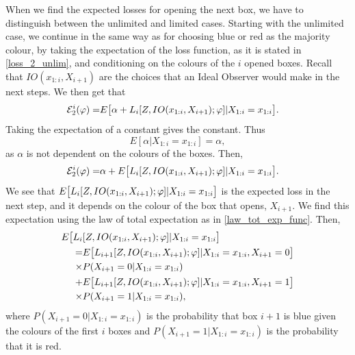 When we find the expected losses for opening the next box, we have to distinguish between the unlimited and limited cases. Starting with the unlimited case, we continue in the same way as for choosing blue or red as the majority colour, by taking the expectation of the loss function, as it is stated in \eqref{loss_2_unlim}, and conditioning on the colours of the $i$ opened boxes. Recall that $IO(x_{1:i},X_{i+1})$ are the choices that an Ideal Observer would make in the next steps. We then get that
\begin{equation*}
    \begin{aligned}
        \mathcal{E}^i_{2}(\varphi) 
        =& E \big[ \alpha + L_i[Z,IO(x_{1:i},X_{i+1});\varphi] |X_{1:i}=x_{1:i}\big].
    \end{aligned}
\end{equation*}
Taking the expectation of a constant gives the constant. Thus
\begin{equation*}
    E[\alpha|X_{1:i}=x_{1:i}]=\alpha,
\end{equation*}
as $\alpha$ is not dependent on the colours of the boxes. Then,
\begin{equation}
\label{exp_loss_unlim_2_unfinished}
    \begin{aligned}
        \mathcal{E}^i_{2}(\varphi) 
        =& \alpha + E \big[L_i[Z,IO(x_{1:i},X_{i+1});\varphi] |X_{1:i}=x_{1:i}\big].
    \end{aligned}
\end{equation}
We see that $E \big[L_i[Z,IO(x_{1:i},X_{i+1});\varphi] |X_{1:i}=x_{1:i}\big]$ is the expected loss in the next step, and it depends on the colour of the box that opens, $X_{i+1}$. We find this expectation using the law of total expectation as in \eqref{law_tot_exp_func}. Then,
\begin{equation}
\label{exp_loss_next_unlim}
    \begin{aligned}
        E \big[L_i&[Z,IO(x_{1:i},X_{i+1});\varphi] |X_{1:i}=x_{1:i}\big] \\
        =& E \big[L_{i+1}[Z,IO(x_{1:i},X_{i+1});\varphi] |X_{1:i}=x_{1:i},X_{i+1}=0\big]\\
        \times& P(X_{i+1}=0|X_{1:i}=x_{1:i}) \\
        +& E \big[L_{i+1}[Z,IO(x_{1:i},X_{i+1});\varphi] |X_{1:i}=x_{1:i},X_{i+1}=1\big]\\
        \times & P(X_{i+1}=1|X_{1:i}=x_{1:i}),
    \end{aligned}
\end{equation}
where $P(X_{i+1}=0|X_{1:i}=x_{1:i})$ is the probability that box $i+1$ is blue given the colours of the first $i$ boxes and $P(X_{i+1}=1|X_{1:i}=x_{1:i})$ is the probability that it is red.  

